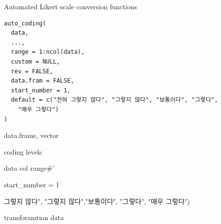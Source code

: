 \documentclass[a4paper]{book}
\begin{document}
%
\begin{Description}
Automated Likert scale conversion functions
\end{Description}
%
\begin{Usage}
\begin{verbatim}
auto_coding(
  data,
  ...,
  range = 1:ncol(data),
  custom = NULL,
  rev = FALSE,
  data.fram = FALSE,
  start_number = 1,
  default = c("전혀 그렇지 않다", "그렇지 않다", "보통이다", "그렇다",
    "매우 그렇다")
)
\end{verbatim}
\end{Usage}
%
\begin{Arguments}
\begin{ldescription}
\item[\code{data}] data.frame, vector

\item[\code{...}] coding levels

\item[\code{range}] data col range\#'

\item[\code{start\_number}] start\_number = 1

\item[\code{defaultc("전혀}] 그렇지 않다", "그렇지 않다","보통이다", "그렇다", "매우 그렇다")
\end{ldescription}
\end{Arguments}
%
\begin{Value}
transforamtion data
\end{Value}
%
\end{document}
